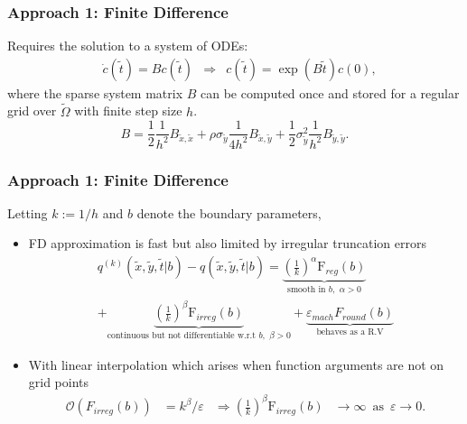 \documentclass{beamer}
\begin{document}
\begin{frame}
  \frametitle{Approach 1: Finite Difference}
  Requires the solution to a system of ODEs:
  \begin{align*}
    & \dot{c}(\tilde{t}) = Bc(\tilde{t}) &\Rightarrow& c(\tilde{t}) = \exp\left(B\tilde{t}\right)c(0), 
  \end{align*}
  where the sparse system matrix $B$ can be computed once and stored for a regular grid over $\tilde{\Omega}$ with finite step size $h$. 
  \[ B = \frac{1}{2} \frac{1}{h^2}B_{\tilde{x},\tilde{x}} +
    \rho\sigma_{\tilde{y}} \frac{1}{4h^2}B_{\tilde{x},\tilde{y}} +
    \frac{1}{2}\sigma_{\tilde{y}}^2
    \frac{1}{h^2}B_{\tilde{y},\tilde{y}}.
\]
\end{frame}
\begin{frame}
  \frametitle{Approach 1: Finite Difference}
  Letting $k := 1/h$ and $b$ denote the boundary parameters, 
\begin{itemize}
  \item FD approximation is fast but also limited by irregular truncation errors
  \begin{multline*}
    q^{(k)}(\tilde{x},\tilde{y},\tilde{t} | b) - q(\tilde{x},\tilde{y},\tilde{t} | b) = \underbrace{\left( \frac{1}{k}
    \right)^{\alpha} \mbox{F}_{reg}(b)}_{\mbox{smooth in } b, \,\,\alpha > 0} \\
    + \underbrace{\left( \frac{1}{k}\right)^{\beta}\mbox{F}_{irreg}(b)}_{\mbox{continuous but not differentiable w.r.t }b, \,\, \beta > 0} + \underbrace{\varepsilon_{mach}F_{round}(b)}_{\mbox{behaves as a R.V}}
  \end{multline*}
  \item With linear interpolation which arises when function arguments are not on grid points
  \begin{align*}
    \mathcal{O}(F_{irreg}(b)) &= k^\beta/\varepsilon &\Rightarrow \left( \frac{1}{k}\right)^{\beta}\mbox{F}_{irreg}(b) &\to \infty \,\,\, \mbox{as} \,\,\, \varepsilon \to 0.
  \end{align*}
\end{itemize}
\end{frame}
\end{document}
